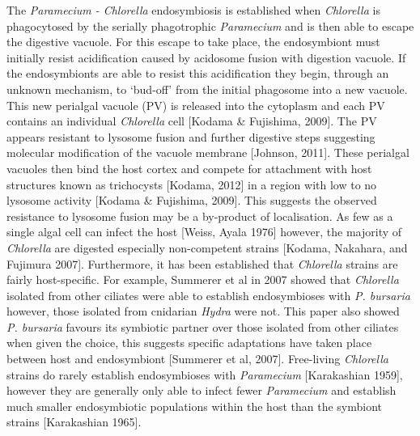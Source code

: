 \documentclass[a4paper,11pt]{article}
\begin{document}
The \textit{Paramecium - Chlorella} endosymbiosis is established when \textit{Chlorella} is phagocytosed by the serially phagotrophic \textit{Paramecium} and is then able to escape the digestive vacuole.  
For this escape to take place, the endosymbiont must initially resist acidification caused by acidosome fusion with digestion vacuole.  
If the endosymbionts are able to resist this acidification they begin, through an unknown mechanism, to `bud-off' from the initial phagosome into a new vacuole.  
This new perialgal vacuole (PV) is released into the cytoplasm and each PV contains an individual \textit{Chlorella} cell [Kodama \& Fujishima, 2009].
The PV appears resistant to lysosome fusion and further digestive steps suggesting molecular modification of the vacuole membrane [Johnson, 2011]. 
These perialgal vacuoles then bind the host cortex and compete for attachment with host structures known as trichocysts [Kodama, 2012] in a region with low to no lysosome activity [Kodama \& Fujishima, 2009].  
This suggests the observed resistance to lysosome fusion may be a by-product of localisation. 
As few as a single algal cell can infect the host [Weiss, Ayala 1976] however, the majority of \textit{Chlorella} are digested especially non-competent strains [Kodama, Nakahara, and Fujimura 2007].  
Furthermore, it has been established that \textit{Chlorella} strains are fairly host-specific.  
For example, Summerer et al in 2007 showed that \textit{Chlorella} isolated from other ciliates were able to establish endosymbioses with \textit{P. bursaria} however, those isolated from cnidarian \textit{Hydra} were not.  
This paper also showed \textit{P. bursaria} favours its symbiotic partner over those isolated from other ciliates when given the choice, this suggests specific adaptations have taken place between host and endosymbiont [Summerer et al, 2007].
Free-living \textit{Chlorella} strains do rarely establish endosymbioses with \textit{Paramecium} [Karakashian 1959], however they are generally only able to infect fewer \textit{Paramecium} and establish much smaller endosymbiotic populations within the host than the symbiont strains [Karakashian 1965].
\end{document}

